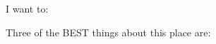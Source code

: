 \documentclass{article}
\begin{document}

I want to:

Three of the BEST things about this place are:




\end{document}
